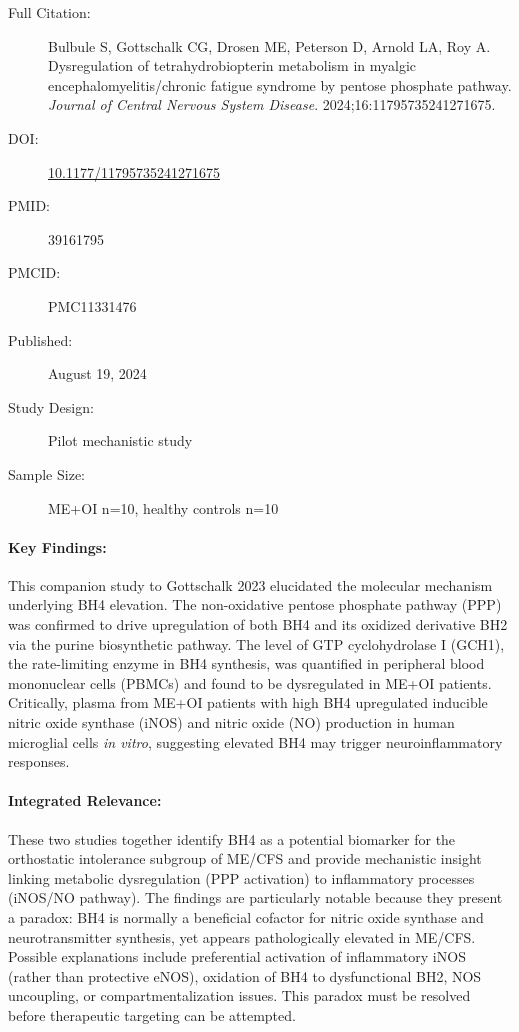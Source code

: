 \begin{description}
    \item[Full Citation:] Bulbule S, Gottschalk CG, Drosen ME, Peterson D, Arnold LA, Roy A. Dysregulation of tetrahydrobiopterin metabolism in myalgic encephalomyelitis/chronic fatigue syndrome by pentose phosphate pathway. \textit{Journal of Central Nervous System Disease}. 2024;16:11795735241271675.
    \item[DOI:] \href{https://doi.org/10.1177/11795735241271675}{10.1177/11795735241271675}
    \item[PMID:] 39161795
    \item[PMCID:] PMC11331476
    \item[Published:] August 19, 2024
    \item[Study Design:] Pilot mechanistic study
    \item[Sample Size:] ME+OI n=10, healthy controls n=10
\end{description}

\paragraph{Key Findings:}
This companion study to Gottschalk 2023 elucidated the molecular mechanism underlying BH4 elevation. The non-oxidative pentose phosphate pathway (PPP) was confirmed to drive upregulation of both BH4 and its oxidized derivative BH2 via the purine biosynthetic pathway. The level of GTP cyclohydrolase I (GCH1), the rate-limiting enzyme in BH4 synthesis, was quantified in peripheral blood mononuclear cells (PBMCs) and found to be dysregulated in ME+OI patients. Critically, plasma from ME+OI patients with high BH4 upregulated inducible nitric oxide synthase (iNOS) and nitric oxide (NO) production in human microglial cells \emph{in vitro}, suggesting elevated BH4 may trigger neuroinflammatory responses.

\paragraph{Integrated Relevance:}
These two studies together identify BH4 as a potential biomarker for the orthostatic intolerance subgroup of ME/CFS and provide mechanistic insight linking metabolic dysregulation (PPP activation) to inflammatory processes (iNOS/NO pathway). The findings are particularly notable because they present a paradox: BH4 is normally a beneficial cofactor for nitric oxide synthase and neurotransmitter synthesis, yet appears pathologically elevated in ME/CFS. Possible explanations include preferential activation of inflammatory iNOS (rather than protective eNOS), oxidation of BH4 to dysfunctional BH2, NOS uncoupling, or compartmentalization issues. This paradox must be resolved before therapeutic targeting can be attempted.

